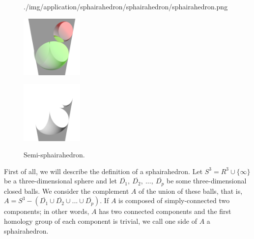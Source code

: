 \begin{figure}[h!tbp]
\begin{minipage}[t]{0.6\textwidth}
\begin{minipage}[t]{0.19\textwidth}
   {./img/application/sphairahedron/sphairahedron/sphairahedron.png}
   \label{fig:sphairahedronFinite}
  \end{minipage}
  \hspace*{\fill}
  \caption{Sphairahedron.}
  \label{fig:sphairahedron}
 \end{minipage}
 \begin{minipage}[t]{0.4\textwidth}
  \centering
  \begin{minipage}[t]{0.19\textwidth}
   \includegraphics[width=1.2in, height=1.2in, keepaspectratio]{./img/application/sphairahedron/sphairahedron/semiSphairaAll.png}
   \label{fig:semi-sphairaAll}
  \end{minipage}
  \hspace*{\fill}
  \begin{minipage}[t]{0.19\textwidth}
   \includegraphics[width=1.2in, height=1.2in, keepaspectratio]{./img/application/sphairahedron/sphairahedron/semiSphairaHalf.png}
   \label{fig:semi-sphairaHalf}
  \end{minipage}
  \hspace*{\fill}
  \caption{Semi-sphairahedron.}
  \label{fig:semi-sphairahedron}
 \end{minipage}
\end{figure}

First of all, we will describe the definition of a sphairahedron.
Let $S^3 = R^3 \cup \{\infty\}$ be a three-dimensional sphere and let
$\overline{D_1},~\overline{D_2},~...,~\overline{D_p}$ be some three-dimensional closed balls.
We consider the complement $A$ of the union of these balls, that is,
$A = S^3 - (\overline{D_1} \cup \overline{D_2} \cup ... \cup \overline{D_p})$.
If $A$ is composed of simply-connected two components;
in other words, $A$ has two connected components and the first homology
group of each component is trivial, we call one side of $A$
a sphairahedron.

